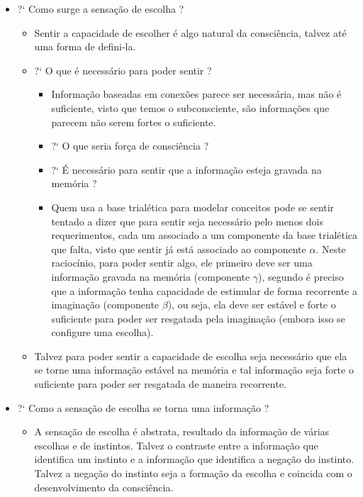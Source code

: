 \documentclass[10pt,a4paper]{report}
\begin{document}
\begin{itemize}
\begin{itemize}
	\end{itemize}
	\item[ (vi) ] ?` Como surge a sensação de escolha ?
	\begin{itemize}
		\item[ (i) ] Sentir a capacidade de escolher é algo natural da consciência, talvez até uma forma de defini-la.
		\item[ (ii) ] ?` O que é necessário para poder sentir ?
		\begin{itemize}
			\item[ (i) ] Informação baseadas em conexões parece ser necessária, mas não é suficiente, visto que temos o subconsciente, são informações que parecem não serem fortes o suficiente.
			\item[ (ii) ] ?` O que seria força de consciência ?
			\item[ (iii) ] ?` É necessário para sentir que a informação esteja gravada na memória ?
			\item[ (iv) ] Quem usa a base trialética para modelar conceitos pode se sentir tentado a dizer que para sentir seja necessário pelo menos dois requerimentos, cada um associado a um componente da base trialética que falta, visto que sentir já está associado ao componente $\alpha$. Neste raciocínio, para poder sentir algo, ele primeiro deve ser uma informação gravada na memória (componente $\gamma$), segundo é preciso que a informação tenha capacidade de estimular de forma recorrente a imaginação (componente $\beta$), ou seja, ela deve ser estável e forte o suficiente para poder ser resgatada pela imaginação (embora isso se configure uma escolha).
		\end{itemize}
		\item[ (iii) ] Talvez para poder sentir a capacidade de escolha seja necessário que ela se torne uma informação estável na memória e tal informação seja forte o suficiente para poder ser resgatada de maneira recorrente.
	\end{itemize}
	\item[ (vii) ] ?` Como a sensação de escolha se torna uma informação ?
	\begin{itemize}
		\item[ (i) ] A sensação de escolha é abstrata, resultado da informação de várias escolhas e de instintos. Talvez o contraste entre a informação que identifica um instinto e a informação que identifica a negação do instinto. Talvez a negação do instinto seja a formação da escolha e coincida com o desenvolvimento da consciência.
	\end{itemize}
\end{itemize}
\end{document}
